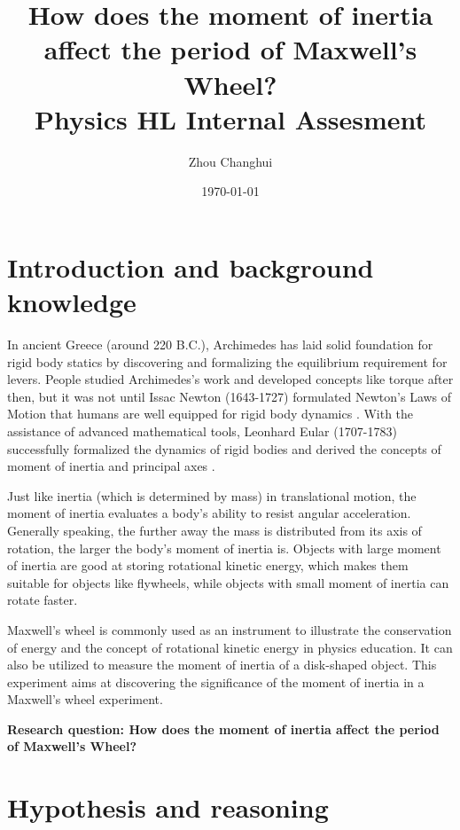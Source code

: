 \documentclass[a4paper]{article}
\begin{document}
\begin{titlepage}
    \title{\textbf{How does the moment of inertia affect the period of Maxwell's Wheel? \\ \small Physics HL Internal Assesment}}
    \author{Zhou Changhui}
    \date{\today}
    \maketitle
\end{titlepage}

\section{Introduction and background knowledge}

In ancient Greece (around 220 B.C.), Archimedes has laid solid foundation for rigid body statics by discovering and formalizing the equilibrium requirement for levers. People studied Archimedes's work and developed concepts like torque after then, but it was not until Issac Newton (1643-1727) formulated Newton's Laws of Motion that humans are well equipped for rigid body dynamics \cite{farber-1961}. With the assistance of advanced mathematical tools, Leonhard Eular (1707-1783) successfully formalized the dynamics of rigid bodies and derived the concepts of moment of inertia and principal axes \cite{marquina2016leonhard}.

Just like inertia (which is determined by mass) in translational motion, the moment of inertia evaluates a body's ability to resist angular acceleration. Generally speaking, the further away the mass is distributed from its axis of rotation, the larger the body's moment of inertia is. Objects with large moment of inertia are good at storing rotational kinetic energy, which makes them suitable for objects like flywheels, while objects with small moment of inertia can rotate faster. 

Maxwell's wheel is commonly used as an instrument to illustrate the conservation of energy and the concept of rotational kinetic energy in physics education. It can also be utilized to measure the moment of inertia of a disk-shaped object. This experiment aims at discovering the significance of the moment of inertia in a Maxwell's wheel experiment.

\textbf{Research question: How does the moment of inertia affect the period of Maxwell's Wheel?}

\section{Hypothesis and reasoning}
\end{document}
